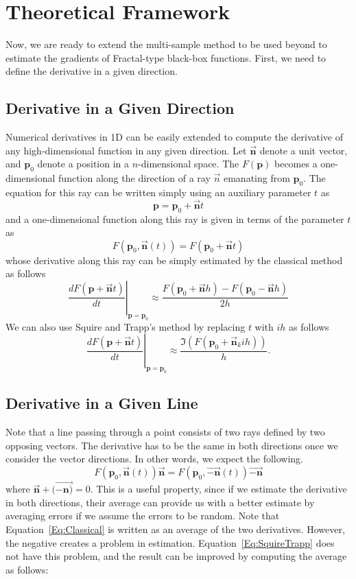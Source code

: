 \documentclass{article}
\begin{document}
\section{Theoretical Framework}

Now, we are ready to extend the multi-sample method to be used beyond to estimate the gradients of Fractal-type black-box functions. First, we need to define the derivative in a given direction. 

\subsection{Derivative in a Given Direction}

Numerical derivatives in 1D can be easily extended to compute the derivative of any high-dimensional function in any given direction. Let $\vec{\mathbf{n}}$ denote a unit vector, and $\mathbf{p}_0$ denote a position in a $n$-dimensional space. The $F(\mathbf{p})$ becomes a one-dimensional function along the direction of a ray $\vec{n}$ emanating from $\mathbf{p}_0$.  The equation for this ray can be written simply using an auxiliary parameter $t$ as
$$\mathbf{p} = \mathbf{p}_0 + \vec{\mathbf{n}} t $$
and a one-dimensional function along this ray is given in terms of the parameter $t$ as
$$ F(\mathbf{p}_0, \vec{\mathbf{n}}(t) )= F(\mathbf{p}_0 + \vec{\mathbf{n}} t)$$
whose derivative along this ray can be simply estimated by the classical method as follows
\begin{equation}
\left. \frac{dF(\mathbf{p} + \vec{\mathbf{n}}t)}{dt} \right|_{\mathbf{p}=\mathbf{p}_0} \approx \frac{F(\mathbf{p}_0 + \vec{\mathbf{n}}h)-F(\mathbf{p}_0 - \vec{\mathbf{n}}h)}{2h} \label{Eq:Classical}
\end{equation}
We can also use Squire and Trapp's method by replacing $t$ with $i h$ \cite{almohy2010,squire1998} as follows
\begin{equation}\left. \frac{dF(\mathbf{p} + \vec{\mathbf{n}}t)}{dt} \right|_{\mathbf{p}=\mathbf{p}_0} \approx \frac{ \Im ( F (\mathbf{p}_0 + \vec{\mathbf{n}}_k i h ))}{h} .  \label{Eq:SquireTrapp}
\end{equation}

\subsection{Derivative in a Given Line} 

Note that a line passing through a point consists of two rays defined by two opposing vectors. The derivative has to be the same in both directions once we consider the vector directions. In other words, we expect the following.  
$$ F(\mathbf{p}_0, \vec{\mathbf{n}}(t)) \vec{\mathbf{n}} = F(\mathbf{p}_0,\vec{\mathbf{-n}}(t) ) \vec{\mathbf{-n}} $$
where $\vec{\mathbf{n}} + (\vec{\mathbf{-n})} = 0$. This is a useful property, since if we estimate the derivative in both directions, their average can provide us with a better estimate by averaging errors if we assume the errors to be random. Note that Equation~\ref{Eq:Classical} is written as an average of the two derivatives. However, the negative creates a problem in estimation. Equation~\ref{Eq:SquireTrapp} does not have this problem, and the result can be improved by computing the average as follows: 
\end{document}
